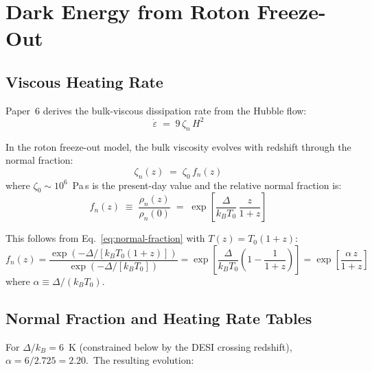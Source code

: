 \documentclass[12pt,letterpaper]{article}
\begin{document}
\section{Dark Energy from Roton Freeze-Out}
\label{sec:dark-energy}

\subsection{Viscous Heating Rate}

Paper~6 derives the bulk-viscous dissipation rate from the Hubble flow:
%
\begin{equation}
  \dot\varepsilon \;=\; 9\,\zeta_n\,H^2
  \label{eq:dissipation}
\end{equation}

In the roton freeze-out model, the bulk viscosity evolves with redshift through
the normal fraction:
%
\begin{equation}
  \zeta_n(z) \;=\; \zeta_0 \, f_n(z)
  \label{eq:zeta-evolution}
\end{equation}
%
where $\zeta_0 \sim 10^6$~Pa\,s is the present-day value and the relative
normal fraction is:
%
\begin{equation}
  f_n(z) \;\equiv\; \frac{\rho_n(z)}{\rho_n(0)}
    \;=\; \exp\!\left[\frac{\Delta}{k_B T_0}\,\frac{z}{1+z}\right]
  \label{eq:fn}
\end{equation}

This follows from Eq.~\ref{eq:normal-fraction} with $T(z) = T_0(1+z)$:
%
\begin{equation}
  f_n(z) = \frac{\exp(-\Delta/[k_B T_0(1+z)])}{\exp(-\Delta/[k_B T_0])}
    = \exp\!\left[\frac{\Delta}{k_B T_0}\left(1 - \frac{1}{1+z}\right)\right]
    = \exp\!\left[\frac{\alpha\,z}{1+z}\right]
\end{equation}
%
where $\alpha \equiv \Delta/(k_B T_0)$.


\subsection{Normal Fraction and Heating Rate Tables}

For $\Delta/k_B = 6$~K (constrained below by the DESI crossing redshift),
$\alpha = 6/2.725 = 2.20$.\ The resulting evolution:
\end{document}
